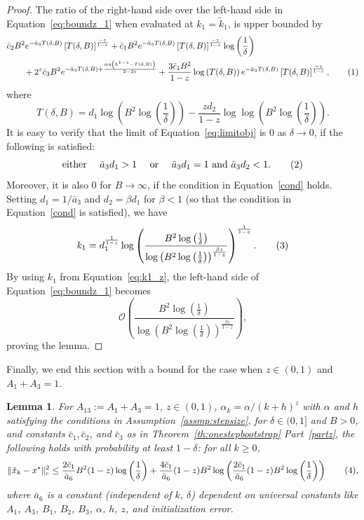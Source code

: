 \documentclass{article}
\newcommand{\numberthis}{\addtocounter{equation}{1}\tag{\theequation}}
\newcommand{\lrp}[1]{\left( #1 \right)}
\newcommand{\lrs}[1]{\left[ #1 \right]}
\newtheorem{lemma}[theorem]{Lemma}
\begin{document}
\begin{proof}
The ratio of the right-hand side over the left-hand side in Equation~\eqref{eq:boundz_1} when evaluated at $k_1 = \tilde{k}_1$, is upper bounded by 
\begin{align*}
    &\bar{c}_2 B^2 e^{-\bar{a}_3 T(\delta, B)} \lrs{T(\delta, B)}^{\frac{-z}{1-z}} + \bar{c}_1 B^2 e^{-\bar{a}_3 T(\delta, B)} \lrs{T(\delta, B)}^{\frac{-z}{1-z}}\log\left(\frac{1}{\delta}\right) \\ 
    & \qquad  + 2^z \bar{c}_3  B^2 e^{-\bar{a}_3 T(\delta, B) + \frac{\alpha \eta \lrp{ h^{1-z}  - T(\delta, B) }}{2-2z} } + \frac{3 \bar{c}_1 B^2 }{1-z} \log\lrp{T(\delta, B)}  e^{-\bar{a}_3 T(\delta, B)} \lrs{T(\delta, B)}^{\frac{-z}{1-z}},\numberthis\label{eq:limitobj}
\end{align*}
where
\[ T(\delta, B) = d_1 \log\lrp{B^2 \log\left(\frac{1}{\delta}\right)} - 
 \frac{z d_2}{1-z} \log{\log\lrp{B^2 \log\left(\frac{1}{\delta}\right)}}. \]
It is easy to verify that the limit of Equation~\eqref{eq:limitobj} is $0$ as $\delta\rightarrow 0$, if the following is satisfied:
\[\text{either }\quad \bar{a}_3 d_1 > 1\quad\text{ or }\quad\bar{a}_3 d_1 = 1\text{ and }\bar{a}_3 d_2 < 1. \numberthis \label{cond}\] 
Moreover, it is also $0$ for $B \rightarrow \infty$, if the condition in Equation~\eqref{cond} holds. Setting $d_1 = 1/\bar{a}_3$ and $d_2 = \beta d_1$ for $\beta < 1$ (so that the condition in Equation~\eqref{cond} is satisfied), we have
\[ k_1 = d^{\frac{1}{1-z}}_1\log\lrp{\frac{B^2 \log\left(\frac{1}{\delta}\right)}{\log \lrp{B^2\log\left(\frac{1}{\delta}\right)}^{\frac{\beta z}{1-z}}} }^\frac{1}{1-z}. \numberthis\label{eq:k1_z}\]
By using $k_1$ from Equation~\eqref{eq:k1_z}, the left-hand side of Equation~\eqref{eq:boundz_1} becomes
\[ \mathcal{O}\lrp{ \frac{B^2 \log\left(\frac{1}{\delta}\right)}{ \log\lrp{B^2\log\left(\frac{1}{\delta}\right)}^{\frac{\beta z}{1-z}} } }, \]
proving the lemma.
\end{proof}
Finally, we end this section with a bound for the case when $z \in (0,1)$ and $A_1 + A_3 = 1$. 
\begin{lemma}\label{lem:ballbound3}
    For $A_{13}:= A_1 + A_3 = 1$, $z\in (0,1)$, $\alpha_k = \alpha/(k+h)^z$ with $\alpha$ and $h$ satisfying the conditions in Assumption~\ref{assmp:stepsize},  for $\delta \in (0,1]$ and $B > 0$, and constants $\bar{c}_1, \bar{c}_2$, and $\bar{c}_3$ as in Theorem~\ref{th:onestepbootstrap} Part~\ref{partz}, %
    the following holds with probability at least $1-\delta$: for all $k \ge 0$,
    \[ \|\tilde{x}_k - x^*\|^2_c \le  \frac{2\bar{c}_1}{\bar{a}_6} B^2 (1-z) \log\lrp{\frac{1}{\delta}} + \frac{4\bar{c}_1}{\bar{a}_6} (1-z) B^2 \log\lrp{ \frac{2\bar{c}_1}{\bar{a}_6} (1-z) B^2  \log\lrp{\frac{1}{\delta}} } \numberthis\label{eq:worstcaseintersectionvalue_equal}, \]
    where $\bar{a}_6$ is a constant (independent of $k$, $\delta$) dependent on universal constants like $A_1$, $A_3$, $B_1$, $B_2$, $B_3$, $\alpha$, $h$, $z$, and initialization error.
\end{lemma}
\end{document}

